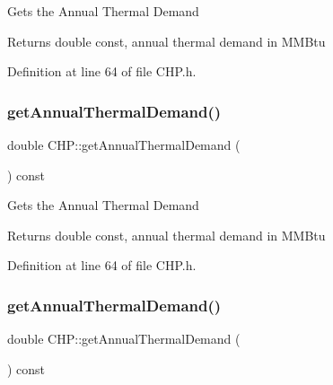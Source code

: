 Gets the Annual Thermal Demand

\begin{DoxyReturn}{Returns}
double const, annual thermal demand in M\+M\+Btu 
\end{DoxyReturn}


Definition at line 64 of file C\+H\+P.\+h.

\mbox{\label{class_c_h_p_a849a576483b92b131ebfc0615e1e0bdb}} 
\subsubsection{\texorpdfstring{get\+Annual\+Thermal\+Demand()}{getAnnualThermalDemand()}\hspace{0.1cm}{\footnotesize\ttfamily [2/3]}}
{\footnotesize\ttfamily double C\+H\+P\+::get\+Annual\+Thermal\+Demand (\begin{DoxyParamCaption}{ }\end{DoxyParamCaption}) const\hspace{0.3cm}{\ttfamily [inline]}}

Gets the Annual Thermal Demand

\begin{DoxyReturn}{Returns}
double const, annual thermal demand in M\+M\+Btu 
\end{DoxyReturn}


Definition at line 64 of file C\+H\+P.\+h.

\mbox{\label{class_c_h_p_a849a576483b92b131ebfc0615e1e0bdb}} 
\subsubsection{\texorpdfstring{get\+Annual\+Thermal\+Demand()}{getAnnualThermalDemand()}\hspace{0.1cm}{\footnotesize\ttfamily [3/3]}}
{\footnotesize\ttfamily double C\+H\+P\+::get\+Annual\+Thermal\+Demand (\begin{DoxyParamCaption}{ }\end{DoxyParamCaption}) const\hspace{0.3cm}{\ttfamily [inline]}}

